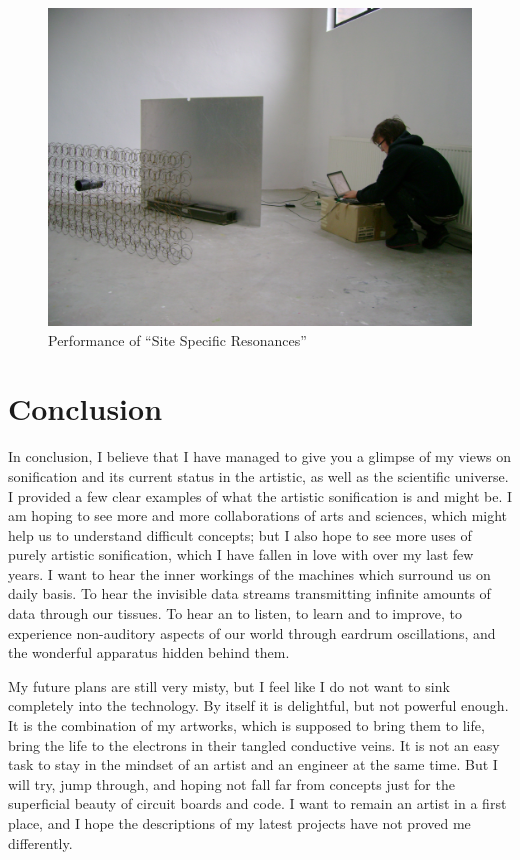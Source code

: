 \documentclass[12pt,a4paper,oneside]{report}
\begin{document}
\begin{figure}  
  \centering
    \includegraphics[width=1\textwidth]{img/sitespec}
        \caption{Performance of ``Site Specific Resonances''}
        \label{fig:sitespec}
\end{figure}

\chapter{Conclusion}
In conclusion, I believe that I have managed to give you a glimpse of my views on sonification and its current status in the artistic, as well as the scientific universe. I provided a few clear examples of what the artistic sonification is and might be. I am hoping to see more and more collaborations of arts and sciences, which might help us to understand difficult concepts; but I also hope to see more uses of purely artistic sonification, which I have fallen in love with over my last few years. I want to hear the inner workings of the machines which surround us on daily basis. To hear the invisible data streams transmitting infinite amounts of data through our tissues. To hear an to listen, to learn and to improve, to experience non-auditory aspects of our world through eardrum oscillations, and the wonderful apparatus hidden behind them.

My future plans are still very misty, but I feel like I do not want to sink completely into the technology. By itself it is delightful, but not powerful enough. It is the combination of my artworks, which is supposed to bring them to life, bring the life to the electrons in their tangled conductive veins. It is not an easy task to stay in the mindset of an artist and an engineer at the same time. But I will try, jump through, and hoping not fall far from concepts just for the superficial beauty of circuit boards and code. I want to remain an artist in a first place, and I hope the descriptions of my latest projects have not proved me differently. 
\end{document}
